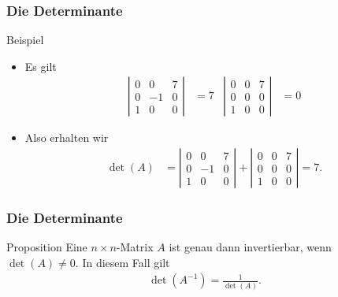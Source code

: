 \documentclass{beamer}
\newcommand{\abs}[1]{\left|#1\right|}
\newcommand{\mytitle}{Die Determinante}
\begin{document}
\begin{frame}\frametitle{\mytitle}
	\begin{block}{Beispiel}
		\begin{itemize}
			\item Es gilt
				\begin{align*}
					\abs{\begin{array}{ccc}0&0&7\\0&-1&0\\1&0&0\end{array}}&=7&
					\abs{\begin{array}{ccc}0&0&7\\0&0&0\\1&0&0\end{array}}&=0
				\end{align*}
			\item Also erhalten wir 
				\begin{align*}
					\det(A)&=\abs{\begin{array}{ccc}0&0&7\\0&-1&0\\1&0&0\end{array}}+\abs{\begin{array}{ccc}0&0&7\\0&0&0\\1&0&0\end{array}}=7.
				\end{align*}
		\end{itemize}
	\end{block}
\end{frame}

\begin{frame}\frametitle{\mytitle}
	\begin{block}{Proposition}
		Eine $n\times n$-Matrix	$A$ ist genau dann invertierbar, wenn $\det(A)\neq0$.
		In diesem Fall gilt
		\begin{align*}
			\det(A^{-1})=\frac{1}{\det(A)}.
		\end{align*}
	\end{block}
\end{frame}
\end{document}

